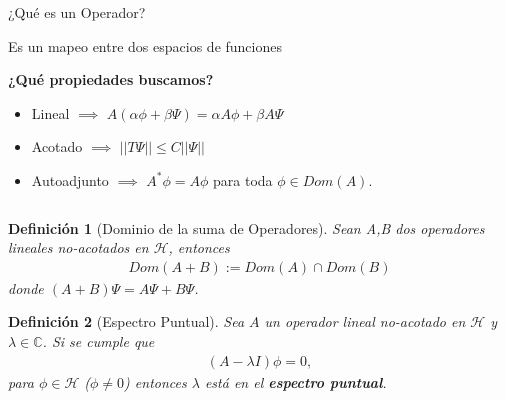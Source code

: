\documentclass[aspectratio=1610]{beamer}
\newcommand*{\field}[1]{\mathbb{#1}}
\newtheorem*{defn}{Definición}
\begin{document}
\begin{frame}{¿Qué es un Operador?}

Es un mapeo entre dos espacios de funciones
\vspace{0.05\textheight} 

\textbf{\textcolor{Ocean}{¿Qué propiedades buscamos?}}

\vspace{0.05\textheight} 
\begin{itemize}
    \item Lineal $\implies$ $A(\alpha\phi + \beta\Psi) = \alpha A\phi + \beta A \Psi$
    \vspace{0.03\textheight} 
    \item Acotado $\implies$ $||T\Psi||
    \leq C||\Psi||$
    \vspace{0.03\textheight} 
    \item Autoadjunto $\implies$ $A^{*}\phi = A\phi$ para toda $\phi \in Dom(A)$.
\end{itemize}
   
\begin{columns}
\column{37em}
\end{columns}
\end{frame}

\begin{frame}{}

\begin{defn}[Dominio de la suma de Operadores]
    Sean A,B dos operadores lineales no-acotados en $\mathcal{H}$, entonces
    \begin{align}
        Dom(A+B) := Dom(A)\cap Dom(B)
        \label{eq:SumadeOperadores}
    \end{align}
    donde $(A+B)\Psi = A\Psi + B\Psi$.
    \label{def:DomOPADJS}
\end{defn}
\begin{defn}[Espectro Puntual]
    Sea $A$ un operador lineal no-acotado en $\mathcal{H}$ y $\lambda\in\field{C}$. Si se cumple que 
    \begin{align*}
        (A-\lambda I)\phi = 0,
    \end{align*}
    para $\phi\in\mathcal{H}$ ($\phi\neq0$) entonces $\lambda$ está en el \textbf{espectro puntual}. 
\end{defn}

\begin{columns}
\column{37em}
\end{columns}
\end{frame}
\end{document}
